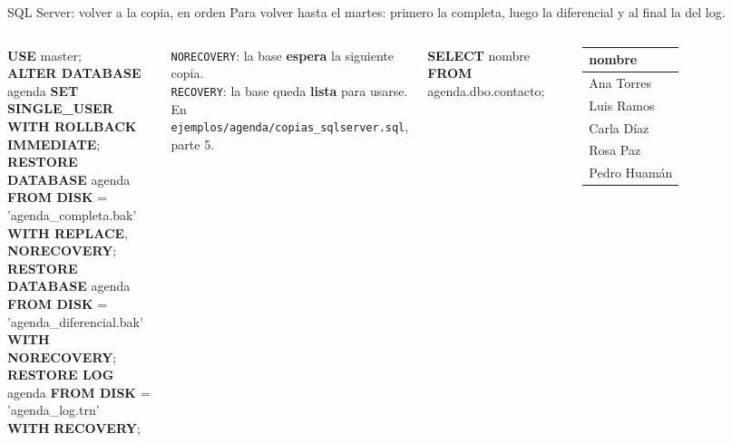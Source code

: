\documentclass[aspectratio=169,10pt,c]{beamer}
\newcommand{\kw}[1]{\textcolor{utpRojo}{\textbf{#1}}}
\newcommand{\gris}[1]{\textcolor{utpGris}{#1}}
\newcommand{\dentro}[1]{{\setlength{\fboxsep}{1.5pt}\colorbox{yellow!45}{#1}}}
\newcommand{\fila}{\rowcolor{yellow!45}}
\newenvironment{sqlchico}[1][.86\textwidth]
  {\begin{center}\begin{lrbox}{\sqlbuf}\begin{minipage}{#1}\ttfamily\scriptsize\vspace{5pt}\raggedright}
  {\vspace{5pt}\end{minipage}\end{lrbox}\colorbox{utpGrisClaro}{\usebox{\sqlbuf}}\end{center}}
\newenvironment{sqlmicro}[1][.86\textwidth]
  {\begin{center}\begin{lrbox}{\sqlbuf}\begin{minipage}{#1}\ttfamily\fontsize{6.4}{7.5}\selectfont\vspace{4pt}\raggedright}
  {\vspace{4pt}\end{minipage}\end{lrbox}\colorbox{utpGrisClaro}{\usebox{\sqlbuf}}\end{center}}
\newcommand{\col}{\dimexpr\textwidth-2\fboxsep\relax}
\newcommand{\ind}{\hspace*{1.2em}}
\newcommand{\cab}[1]{\normalfont\bfseries #1}
\newcommand{\res}[3]{%
  \centering{\scriptsize\color{utpGris}resultado}\\[3pt]
  \footnotesize\ttfamily
  \begin{tabular}{#1}
  \toprule
  #2 \\
  \midrule
  #3
  \bottomrule
  \end{tabular}}
\newcommand{\resg}[3]{{\res{#1}{#2}{#3}\par}}
\begin{document}
\begin{frame}{SQL Server: volver a la copia, en orden}
\small Para volver hasta el martes: primero la completa, luego la diferencial y al final la del log.
\vspace{0.15cm}
\begin{center}
\end{center}
\vspace{0.05cm}
\begin{columns}[T,onlytextwidth]
\begin{sqlmicro}[\col]
\kw{USE} master;\\
\kw{ALTER DATABASE} agenda \kw{SET SINGLE\_USER WITH ROLLBACK IMMEDIATE};\\[3pt]
\kw{RESTORE DATABASE} agenda \kw{FROM DISK} = 'agenda\_completa.bak'\\
\ind\kw{WITH REPLACE}, \dentro{\kw{NORECOVERY}};\\
\kw{RESTORE DATABASE} agenda \kw{FROM DISK} = 'agenda\_diferencial.bak'\\
\ind\kw{WITH} \dentro{\kw{NORECOVERY}};\\
\kw{RESTORE LOG} agenda \kw{FROM DISK} = 'agenda\_log.trn'\\
\ind\kw{WITH} \dentro{\kw{RECOVERY}};
\end{sqlmicro}
\footnotesize\raggedright
\texttt{NORECOVERY}: la base \textbf{espera} la siguiente copia.\\
\texttt{RECOVERY}: la base queda \textbf{lista} para usarse.\\[6pt]
\scriptsize\gris{En \texttt{ejemplos/agenda/copias\_sqlserver.sql}, parte 5.}
\begin{sqlchico}[\col]
\kw{SELECT} nombre\\
\kw{FROM} agenda.dbo.contacto;
\end{sqlchico}
\resg{l}{\cab{nombre}}{Ana Torres \\ Luis Ramos \\ Carla Díaz \\ \fila Rosa Paz \\ \fila Pedro Huamán \\}
\end{columns}
\end{frame}
\end{document}
